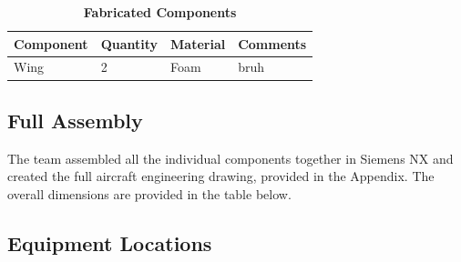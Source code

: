    
    
 \begin{table}[H]
     \begin{center}
     \caption{\textbf{Fabricated Components}} \label{table:fab_components}
     \begin{tabular}{|p{2in}|p{1in}|p{1in}|p{1in}|} %
         \hline \textbf{Component} & \textbf{Quantity} & \textbf{Material} & \textbf{Comments} \\ \hline %
         Wing & 2 & Foam & bruh \\ \hline
     \end{tabular}
     \end{center}
 \end{table}
    
    \subsection{Full Assembly}
    
    The team assembled all the individual components together in Siemens NX and created the full aircraft engineering drawing, provided in the Appendix. The overall dimensions are provided in the table below.
    
    
    
    
    \subsection{Equipment Locations}
    
